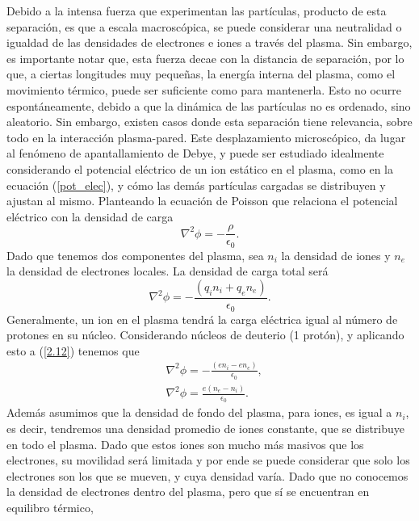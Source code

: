 \documentclass[../main.tex]{subfiles}
\begin{document}
    Debido a la intensa fuerza que experimentan las partículas, producto de esta separación, es que a escala macroscópica, se puede considerar una neutralidad o igualdad de las densidades de electrones e iones a través del plasma. Sin embargo, es importante notar que, esta fuerza decae con la distancia de separación, por lo que, a ciertas longitudes muy pequeñas, la energía interna del plasma, como el movimiento térmico, puede ser suficiente como para mantenerla. Esto no ocurre espontáneamente, debido a que la dinámica de las partículas no es ordenado, sino aleatorio. Sin embargo, existen casos donde esta separación tiene relevancia, sobre todo en la interacción plasma-pared. Este desplazamiento microscópico, da lugar al fenómeno de apantallamiento de Debye, y puede ser estudiado idealmente considerando el potencial eléctrico de un ion estático en el plasma, como en la ecuación (\ref{pot_elec}), y cómo las dem\'as partículas cargadas se distribuyen y ajustan al mismo. Planteando la ecuación de Poisson que relaciona el 
    potencial eléctrico con la densidad de carga 
        \begin{equation}
            \nabla^2\phi = -\frac{\rho}{\epsilon_0}.
        \end{equation}
    Dado que tenemos dos componentes del plasma, sea $n_i$ la densidad de iones y $n_e$ la densidad de electrones locales. La densidad de carga total será
        \begin{equation} \label{2.12}
            \nabla^2\phi =-\frac{(q_in_i+q_en_e)}{\epsilon_0}.
        \end{equation}
    Generalmente, un ion en el plasma tendrá la carga eléctrica igual al número de protones en su núcleo. Considerando núcleos de deuterio (1 protón), y aplicando esto a (\ref{2.12}) tenemos que 
    \begin{align}
        &\nabla^2\phi = -\frac{(en_i-en_e)}{\epsilon_0} \label{2.13}, \\
        &\nabla^2\phi = \frac{e(n_e-n_i)}{\epsilon_0}. \label{2.14}
    \end{align}
    Además asumimos que la densidad de fondo del plasma, para iones, es igual a $n_i$, es decir, tendremos una densidad promedio de iones constante,
    que se distribuye en todo el plasma. Dado que estos iones son mucho más masivos que los electrones, su movilidad será limitada y por ende se puede considerar que solo los electrones son los que se mueven, y cuya densidad varía. Dado que no conocemos la densidad de electrones dentro del plasma, pero que sí se encuentran en equilibro térmico, 
\end{document}
